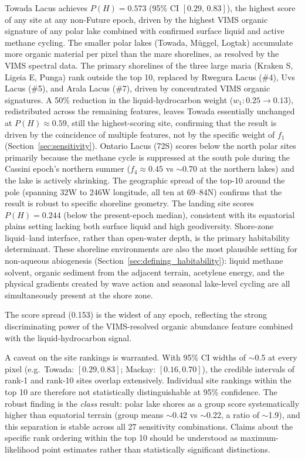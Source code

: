 Towada Lacus achieves $P(H)=0.573$ (95\% CI $[0.29,\,0.83]$), the highest score of any site at any non-Future epoch, driven by the highest VIMS organic signature of any polar lake combined with confirmed surface liquid and active methane cycling.  The smaller polar lakes (Towada, Müggel, Logtak) accumulate more organic material per pixel than the mare shorelines, as resolved by the VIMS spectral data.  The primary shorelines of the three large maria (Kraken S, Ligeia E, Punga) rank outside the top 10, replaced by Rwegura Lacus (\#4), Uvs Lacus (\#5), and Arala Lacus (\#7), driven by concentrated VIMS organic signatures.  A 50\% reduction in the liquid-hydrocarbon weight ($w_1: 0.25 \to 0.13$), redistributed across the remaining features, leaves Towada essentially unchanged at $P(H)\approx0.59$, still the highest-scoring site, confirming that the result is driven by the coincidence of multiple features, not by the specific weight of $f_1$ (Section~\ref{sec:sensitivity}).  Ontario Lacus (72\textdegree{}S) scores below the north polar sites primarily because the methane cycle is suppressed at the south pole during the Cassini epoch's northern summer ($f_4{\approx}0.45$ vs $\sim$0.70 at the northern lakes) and the lake is actively shrinking.  The geographic spread of the top-10 around the pole (spanning 32\textdegree{}W to 246\textdegree{}W longitude, all ten at 69--84\textdegree{}N) confirms that the result is robust to specific shoreline geometry.  The \huygens{} landing site scores $P(H)=0.244$ (below the present-epoch median), consistent with its equatorial plains setting lacking both surface liquid and high geodiversity.  Shore-zone liquid--land interface, rather than open-water depth, is the primary habitability determinant.  These shoreline environments are also the most plausible setting for non-aqueous abiogenesis (Section~\ref{sec:defining_habitability}): liquid methane solvent, organic sediment from the adjacent terrain, acetylene energy, and the physical gradients created by wave action and seasonal lake-level cycling are all simultaneously present at the shore zone.

The score spread (0.153) is the widest of any epoch, reflecting the strong discriminating power of the VIMS-resolved organic abundance feature combined with the liquid-hydrocarbon signal.

A caveat on the site rankings is warranted.  With 95\% CI widths of $\sim$0.5 at every pixel (e.g.\ Towada: $[0.29, 0.83]$; Mackay: $[0.16, 0.70]$), the credible intervals of rank-1 and rank-10 sites overlap extensively.  Individual site rankings within the top 10 are therefore not statistically distinguishable at 95\% confidence.  The robust finding is the \textit{class} result: polar lake shores as a group score systematically higher than equatorial terrain (group means $\sim$0.42 vs $\sim$0.22, a ratio of $\sim$1.9), and this separation is stable across all 27 sensitivity combinations.  Claims about the specific rank ordering within the top 10 should be understood as maximum-likelihood point estimates rather than statistically significant distinctions.

